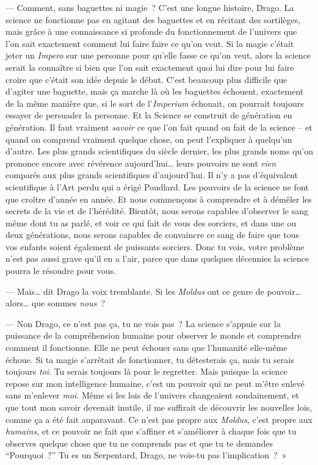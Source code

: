 --- Comment, sans baguettes ni magie~? C'est une longue histoire, Drago.
La science ne fonctionne pas en agitant des baguettes et en récitant des sortilèges, mais grâce à une connaissance si profonde du fonctionnement de l'univers que l'on sait exactement comment lui faire faire ce qu'on veut.
Si la magie c'était jeter un \emph{Impero} sur une personne pour qu'elle fasse ce qu'on veut, alors la science serait la connaître si bien que l'on sait exactement quoi lui dire pour lui faire croire que c'était son idée depuis le début.
C'est beaucoup plus difficile que d'agiter une baguette, mais ça marche là où les baguettes échouent, exactement de la même manière que, si le sort de l'\emph{Imperium} échouait, on pourrait toujours essayer de persuader la personne.
Et la Science se construit de génération en génération.
Il faut vraiment \emph{savoir} ce que l'on fait quand on fait de la science -- et quand on comprend vraiment quelque chose, on peut l'expliquer à quelqu'un d'autre.
Les plus grands scientifiques du siècle dernier, les plus grands noms qu'on prononce encore avec révérence aujourd'hui… leurs pouvoirs ne sont \emph{rien} comparés aux plus grands scientifiques d'aujourd'hui.
Il n'y a pas d'équivalent scientifique à l'Art perdu qui a érigé Poudlard.
Les pouvoirs de la science ne font que croître d'année en année.
Et nous commençons à comprendre et à démêler les secrets de la vie et de l'hérédité.
Bientôt, nous serons capables d'observer le sang même dont tu as parlé, et voir ce qui fait de vous des sorciers, et dans une ou deux générations, nous serons capables de convaincre ce sang de faire que tous vos enfants soient également de puissants sorciers.
Donc tu vois, votre problème n'est pas aussi grave qu'il en a l'air, parce que dans quelques décennies la science pourra le résoudre pour vous.

--- Mais… dit Drago la voix tremblante. Si les \emph{Moldus} ont ce genre de pouvoir… alors… que sommes \emph{nous}~?

--- Non Drago, ce n'est pas ça, tu ne vois pas~?
La science s'appuie sur la puissance de la compréhension humaine pour observer le monde et comprendre comment il fonctionne.
Elle ne peut échouer sans que l'humanité elle-même échoue.
Si ta magie s'arrêtait de fonctionner, tu détesterais ça, mais tu serais toujours \emph{toi}.
Tu serais toujours là pour le regretter.
Mais puisque la science repose sur mon intelligence humaine, c'est un pouvoir qui ne peut m'être enlevé sans m'enlever \emph{moi}.
Même si les lois de l'univers changeaient soudainement, et que tout mon savoir devenait inutile, il me suffirait de découvrir les nouvelles lois, comme ça a été fait auparavant.
Ce n'est pas propre aux \emph{Moldus}, c'est propre aux \emph{humains}, et ce pouvoir ne fait que s'affiner et s'améliorer à chaque fois que tu observes quelque chose que tu ne comprends pas et que tu te demandes “Pourquoi~?”
Tu es un Serpentard, Drago, ne vois-tu pas l'implication~?~»

